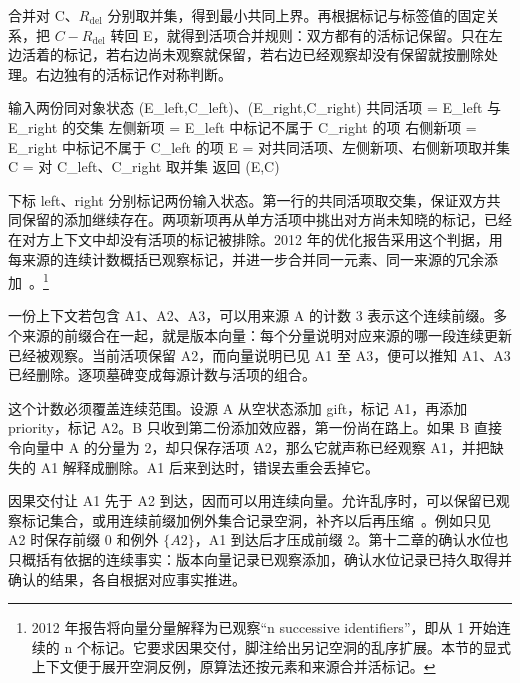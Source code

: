 
合并对 C、$R_{\mathrm{del}}$ 分别取并集，得到最小共同上界。再根据标记与标签值的固定关系，把 $C-R_{\mathrm{del}}$ 转回 E，就得到活项合并规则：双方都有的活标记保留。只在左边活着的标记，若右边尚未观察就保留，若右边已经观察却没有保留就按删除处理。右边独有的活标记作对称判断。

\begin{BookCode}
输入两份同对象状态 (E_left,C_left)、(E_right,C_right)
共同活项 = E_left 与 E_right 的交集
左侧新项 = E_left 中标记不属于 C_right 的项
右侧新项 = E_right 中标记不属于 C_left 的项
E = 对共同活项、左侧新项、右侧新项取并集
C = 对 C_left、C_right 取并集
返回 (E,C)
\end{BookCode}

下标 left、right 分别标记两份输入状态。第一行的共同活项取交集，保证双方共同保留的添加继续存在。两项新项再从单方活项中挑出对方尚未知晓的标记，已经在对方上下文中却没有活项的标记被排除。2012 年的优化报告采用这个判据，用每来源的连续计数概括已观察标记，并进一步合并同一元素、同一来源的冗余添加~\cite{bieniusa2012orset}。\footnote{2012 年报告将向量分量解释为已观察“n successive identifiers”，即从 1 开始连续的 n 个标记。它要求因果交付，脚注给出另记空洞的乱序扩展。本节的显式上下文便于展开空洞反例，原算法还按元素和来源合并活标记。}


一份上下文若包含 A1、A2、A3，可以用来源 A 的计数 3 表示这个连续前缀。多个来源的前缀合在一起，就是版本向量：每个分量说明对应来源的哪一段连续更新已经被观察。当前活项保留 A2，而向量说明已见 A1 至 A3，便可以推知 A1、A3 已经删除。逐项墓碑变成每源计数与活项的组合。

这个计数必须覆盖连续范围。设源 A 从空状态添加 gift，标记 A1，再添加 priority，标记 A2。B 只收到第二份添加效应器，第一份尚在路上。如果 B 直接令向量中 A 的分量为 2，却只保存活项 A2，那么它就声称已经观察 A1，并把缺失的 A1 解释成删除。A1 后来到达时，错误去重会丢掉它。


因果交付让 A1 先于 A2 到达，因而可以用连续向量。允许乱序时，可以保留已观察标记集合，或用连续前缀加例外集合记录空洞，补齐以后再压缩~\cite{bieniusa2012orset}。例如只见 A2 时保存前缀 0 和例外 $\{A2\}$，A1 到达后才压成前缀 2。第十二章的确认水位也只概括有依据的连续事实：版本向量记录已观察添加，确认水位记录已持久取得并确认的结果，各自根据对应事实推进。

